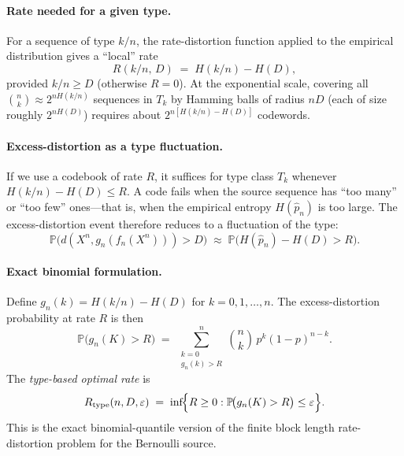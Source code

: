 \documentclass[11pt]{article}
\newcommand{\HD}{H(D)}
\newcommand{\Prob}{\mathbb{P}}
\begin{document}
\paragraph{Rate needed for a given type.}
For a sequence of type $k/n$, the rate-distortion function applied to the
empirical distribution gives a ``local'' rate
\begin{equation}
\label{eq:local_rate}
R(k/n,\, D) \;=\; H(k/n) - \HD,
\end{equation}
provided $k/n \geq D$ (otherwise $R = 0$).
At the exponential scale, covering all $\binom{n}{k} \approx 2^{nH(k/n)}$
sequences in $T_k$ by Hamming balls of radius $nD$ (each of size roughly
$2^{n\HD}$) requires about $2^{n[H(k/n) - \HD]}$ codewords.

\paragraph{Excess-distortion as a type fluctuation.}
If we use a codebook of rate $R$, it suffices for type class $T_k$ whenever
$H(k/n) - \HD \leq R$.
A code fails when the source sequence has ``too many'' or ``too few'' ones---that
is, when the empirical entropy $H(\hat{p}_n)$ is too large.
The excess-distortion event therefore reduces to a fluctuation of the type:
\[
\Prob\!\bigl(d(X^n, g_n(f_n(X^n))) > D\bigr)
\;\approx\;
\Prob\!\bigl(H(\hat{p}_n) - \HD > R\bigr).
\]

\paragraph{Exact binomial formulation.}
Define $g_n(k) = H(k/n) - \HD$ for $k = 0, 1, \ldots, n$.
The excess-distortion probability at rate $R$ is then
\begin{equation}
\label{eq:type_excess}
\Prob\!\bigl(g_n(K) > R\bigr)
\;=\; \sum_{\substack{k=0 \\[1pt] g_n(k) > R}}^{n}
\binom{n}{k}\, p^k (1-p)^{n-k}.
\end{equation}
The \emph{type-based optimal rate} is
\[
R_{\mathrm{type}}(n, D, \varepsilon)
\;=\; \inf\!\Bigl\{R \geq 0 :
\Prob\!\bigl(g_n(K) > R\bigr) \leq \varepsilon\Bigr\}.
\]
This is the exact binomial-quantile version of the finite block length
rate-distortion problem for the Bernoulli source.
\end{document}
